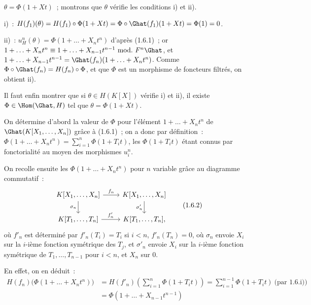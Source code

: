 
\(\theta=\Phi(1+Xt)\)~;
montrons que \(\theta\) vérifie les conditions i) et ii).

i)~: \(H(f_1)(\theta)=H(f_1)\circ\Phi(1+Xt)=\Phi\circ\Ghat(f_1)(1+Xt)=\Phi(1)=0\).

ii)~: \(u_H^n(\theta)=\Phi(1+\ldots+X_nt^n)\) d'après (1.6.1)~; or \(1+\ldots+X_nt^n\equiv 1+\ldots+X_{n-1}t^{n-1}\ \mathrm{mod.}\ F^n\Ghat\), et \(1+\ldots+X_{n-1}t^{n-1}=\Ghat(f_n)(1+\ldots+X_nt^n)\). Comme \(\Phi\circ\Ghat(f_n)=H(f_n)\circ\Phi\), et que \(\Phi\) est un morphisme de foncteurs filtrés, on obtient ii).

Il faut enfin montrer que si \(\theta\in H(K[X])\) vérifie i) et ii), il existe \(\Phi\in\Hom(\Ghat,H)\) tel que \(\theta=\Phi(1+Xt)\).

On détermine d'abord la valeur de \(\Phi\) pour l'élément \(1+\ldots+X_nt^n\) de \(\Ghat(K[X_1,\ldots,X_n])\) grâce à (1.6.1)~; on a donc par définition~: \(\Phi(1+\ldots+X_nt^n)=\sum\limits_{i=1}^n \Phi(1+T_it)\), les \(\Phi(1+T_it)\) étant connus par fonctorialité au moyen des morphismes \(u_i^n\).

On recolle ensuite les \(\Phi(1+\ldots+X_nt^n)\) pour \(n\) variable grâce au diagramme commutatif~:
\[
\begin{tikzcd}
K[X_1,\ldots,X_n] \arrow[r,"f_n"] \arrow[d,"\sigma_n"'] &
K[X_1,\ldots,X_n] \arrow[d,"\sigma'_n"']\\
K[T_1,\ldots,T_n] \arrow[r,"f'_n"] &
K[T_1,\ldots,T_n],
\end{tikzcd}
\tag{1.6.2}
\]
où \(f'_n\) est déterminé par \(f'_n(T_i)=T_i\) si \(i<n\), \(f'_n(T_n)=0\), où \(\sigma_n\) envoie \(X_i\) sur la \(i\)-ième fonction symétrique des \(T_j\), et \(\sigma'_n\) envoie \(X_i\) sur la \(i\)-ième fonction symétrique de \(T_1,\ldots,T_{n-1}\) pour \(i<n\), et \(X_n\) sur \(0\).

En effet, on en déduit~:
\[
\begin{aligned}
H(f_n)\bigl(\Phi(1+\ldots+X_nt^n)\bigr)
&=H(f'_n)\left(\sum_{i=1}^n \Phi(1+T_it)\right)
=\sum_{i=1}^{n-1}\Phi(1+T_it)\ \text{(par 1.6.i))}\\
&=\Phi(1+\ldots+X_{n-1}t^{n-1})
\end{aligned}
\]
